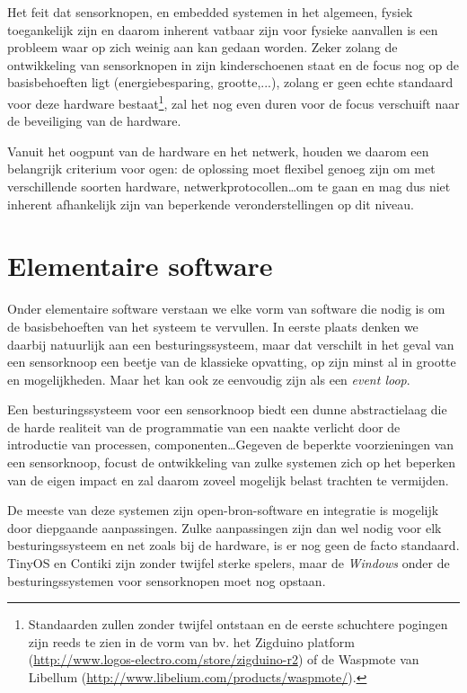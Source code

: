 Het feit dat sensorknopen, en embedded systemen in het algemeen, fysiek
toegankelijk zijn en daarom inherent vatbaar zijn voor fysieke aanvallen is een
probleem waar op zich weinig aan kan gedaan worden. Zeker zolang de
ontwikkeling van sensorknopen in zijn kinderschoenen staat en de focus nog op
de basisbehoeften ligt (energiebesparing, grootte,...), zolang er geen echte
standaard voor deze hardware bestaat\footnote{Standaarden zullen zonder twijfel
ontstaan en de eerste schuchtere pogingen zijn reeds te zien in de vorm van bv.
het Zigduino platform (\url{http://www.logos-electro.com/store/zigduino-r2}) of
de Waspmote van Libellum (\url{http://www.libelium.com/products/waspmote/}).},
zal het nog even duren voor de focus verschuift naar de beveiliging van de
hardware.

Vanuit het oogpunt van de hardware en het netwerk, houden we daarom een
belangrijk criterium voor ogen: de oplossing moet flexibel genoeg zijn om met
verschillende soorten hardware, netwerkprotocollen\dots om te gaan en mag dus
niet inherent afhankelijk zijn van beperkende veronderstellingen op dit niveau.

\vspace{-3mm}

\section{Elementaire software}
\label{section:solution-software}

Onder elementaire software verstaan we elke vorm van software die nodig is om
de basisbehoeften van het systeem te vervullen. In eerste plaats denken we
daarbij natuurlijk aan een besturingssysteem, maar dat verschilt in het geval
van een sensorknoop een beetje van de klassieke opvatting, op zijn minst al in
grootte en mogelijkheden. Maar het kan ook ze eenvoudig zijn als een
\emph{event loop}.

Een besturingssysteem voor een sensorknoop biedt een dunne abstractielaag die
de harde realiteit van de programmatie van een naakte \mcu verlicht door de
introductie van processen, componenten\dots Gegeven de beperkte voorzieningen
van een sensorknoop, focust de ontwikkeling van zulke systemen zich op het
beperken van de eigen impact en zal daarom zoveel mogelijk belast trachten te
vermijden.

De meeste van deze systemen zijn open-bron-software en integratie is mogelijk
door diepgaande aanpassingen. Zulke aanpassingen zijn dan wel nodig voor elk
besturingssysteem en net zoals bij de hardware, is er nog geen de facto
standaard. TinyOS en Contiki zijn zonder twijfel sterke spelers, maar de
\emph{Windows} onder de besturingssystemen voor sensorknopen moet nog opstaan.

